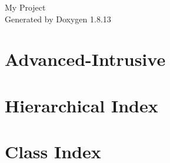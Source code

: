 \documentclass[twoside]{book}
\newcommand{\+}{\discretionary{\mbox{\scriptsize$\hookleftarrow$}}{}{}}
\newcommand{\clearemptydoublepage}{%
  \newpage{\pagestyle{empty}\cleardoublepage}%
}
\begin{document}
\hypersetup{pageanchor=false,
             bookmarksnumbered=true,
             pdfencoding=unicode
            }
\begin{titlepage}
\vspace*{7cm}
\begin{center}%
{\Large My Project }\\
\vspace*{1cm}
{\large Generated by Doxygen 1.8.13}\\
\end{center}
\end{titlepage}
\clearemptydoublepage
{}
\tableofcontents
\clearemptydoublepage
{}
\hypersetup{pageanchor=true}

\chapter{Advanced-\/\+Intrusive}
\label{md__home_hari_GSOC_boost_1_67_0_boost_Advanced-Intrusive-master_README}

\chapter{Hierarchical Index}

\chapter{Class Index}

\end{document}
